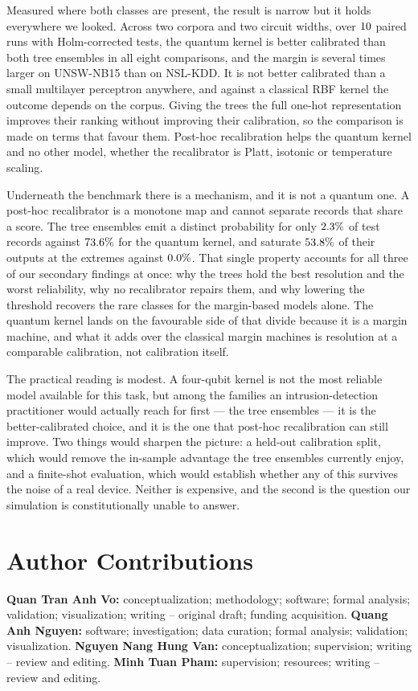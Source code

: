 \documentclass[journal]{IEEEtran}
\begin{document}
Measured where both classes are present, the result is narrow but it holds
everywhere we looked. Across two corpora and two circuit widths, over
$10$ paired runs with Holm-corrected tests, the quantum kernel is
better calibrated than both tree ensembles in all eight comparisons, and the
margin is several times larger on UNSW-NB15 than on NSL-KDD. It is not
better calibrated than a small multilayer perceptron anywhere, and against a
classical RBF kernel the outcome depends on the corpus. Giving the trees the
full one-hot representation improves their ranking without improving their
calibration, so the comparison is made on terms that favour them. Post-hoc
recalibration helps the quantum kernel and no other model, whether the
recalibrator is Platt, isotonic or temperature scaling.

Underneath the benchmark there is a mechanism, and it is not a quantum one.
A post-hoc recalibrator is a monotone map and cannot separate records that
share a score. The tree ensembles emit a distinct probability for only
$2.3\%$ of test records against $73.6\%$ for the
quantum kernel, and saturate $53.8\%$ of their outputs at the extremes
against $0.0\%$. That single property accounts for all three of
our secondary findings at once: why the trees hold the best resolution and
the worst reliability, why no recalibrator repairs them, and why lowering
the threshold recovers the rare classes for the margin-based models alone.
The quantum kernel lands on the favourable side of that divide because it
is a margin machine, and what it adds over the classical margin machines is
resolution at a comparable calibration, not calibration itself.

The practical reading is modest. A four-qubit kernel is not the most
reliable model available for this task, but among the families an
intrusion-detection practitioner would actually reach for first --- the tree
ensembles --- it is the better-calibrated choice, and it is the one that
post-hoc recalibration can still improve. Two things would sharpen the
picture: a held-out calibration split, which would remove the in-sample
advantage the tree ensembles currently enjoy, and a finite-shot evaluation,
which would establish whether any of this survives the noise of a real
device. Neither is expensive, and the second is the question our simulation
is constitutionally unable to answer.

\section*{Author Contributions}
\textbf{Quan Tran Anh Vo:} conceptualization; methodology; software; formal
analysis; validation; visualization; writing -- original draft; funding
acquisition. \textbf{Quang Anh Nguyen:} software; investigation; data
curation; formal analysis; validation; visualization. \textbf{Nguyen Nang
Hung Van:} conceptualization; supervision; writing -- review and editing.
\textbf{Minh Tuan Pham:} supervision; resources; writing -- review and
editing.
\end{document}
